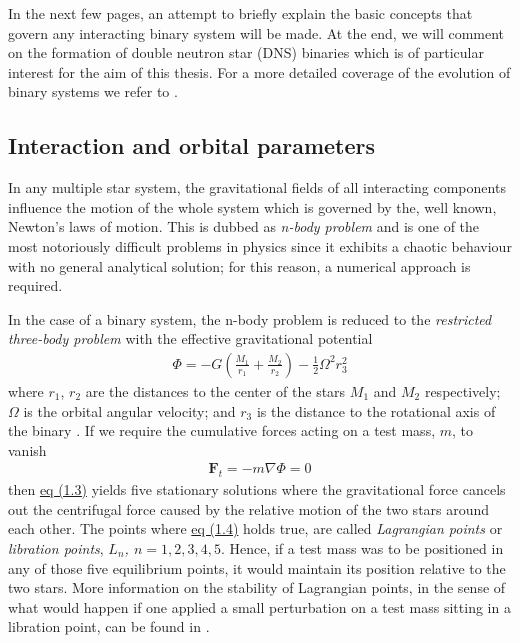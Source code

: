 \documentclass[../../main/thesis_msc.tex]{subfiles}
\begin{document}
		In the next few pages, an attempt to briefly explain the basic concepts that govern any interacting binary system will be made. At the end, we will comment on the formation of double neutron star (DNS) binaries which is of particular interest for the aim of this thesis. For a more detailed coverage of the evolution of binary systems we refer to \cite{Ivanova2015, podsiadlowski_2014, Postnov2014, Eggleton_book, Tauris_2006}.
		
			\subsection{Interaction and orbital parameters}
			
				In any multiple star system, the gravitational fields of all interacting components influence the motion of the whole system which is governed by the, well known, Newton's laws of motion. This is dubbed as \emph{n-body problem} and is one of the most notoriously difficult problems in physics since it exhibits a chaotic behaviour with no general analytical solution; for this reason, a numerical approach is required.

				In the case of a binary system, the n-body problem is reduced to the \emph{restricted three-body problem} with the effective gravitational potential 
					\begin{eqnarray}
						\label{eq:eff_potential}
						\Phi = -G \left( \frac{M_1}{r_1} + \frac{M_2}{r_2} \right) - \frac{1}{2} \Omega^2 r_3^2
					\end{eqnarray}
					where $r_1$, $r_2$ are the distances to the center of the stars $M_1$ and $M_2$ respectively; $\Omega$ is the orbital angular velocity; and $r_3$ is the distance to the rotational axis of the binary \citep[p.~639]{Tauris_2006}. If we require the cumulative forces acting on a test mass, $m$, to vanish
					\begin{eqnarray}
						\label{eq:cum_force}
						\pmb{F}_t = -m \nabla \Phi = 0
					\end{eqnarray}
				then \hyperref[eq:eff_potential]{eq (1.3)} yields five stationary solutions where the gravitational force cancels out the centrifugal force caused by the relative motion of the two stars around each other. The points where \hyperref[eq:cum_force]{eq (1.4)} holds true, are called \emph{Lagrangian points} or \emph{libration points}, \emph{$L_n$, $n=1,2,3,4,5$}. Hence, if a test mass was to be positioned in any of those five equilibrium points, it would maintain its position relative to the two stars. More information on the stability of Lagrangian points, in the sense of what would happen if one applied a small perturbation on a test mass sitting in a libration point, can be found in \cite{Szebehely, Celletti1990, Schwarz2012}.
				
\end{document}
